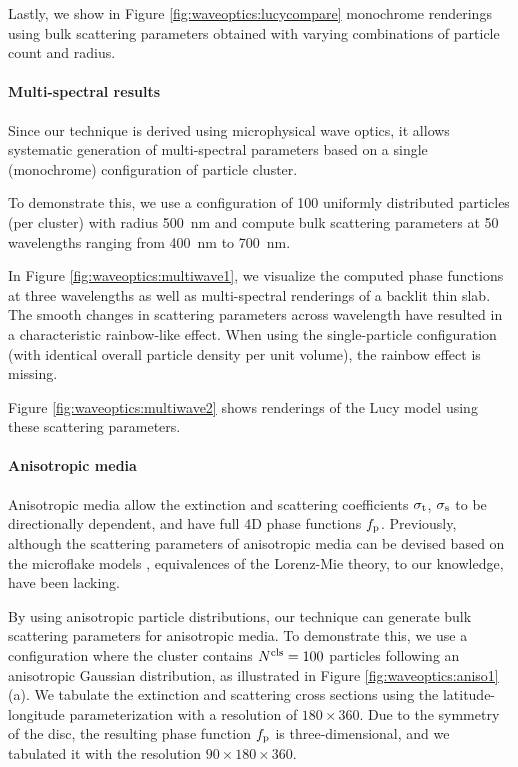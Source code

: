 Lastly, we show in Figure \ref{fig:waveoptics:lucycompare} monochrome renderings using bulk scattering parameters obtained with varying combinations of particle count and radius.


\paragraph{Multi-spectral results}

Since our technique is derived using microphysical wave optics, it allows systematic generation of multi-spectral parameters based on a single (monochrome) configuration of particle cluster.

To demonstrate this, we use a configuration of 100 uniformly distributed particles (per cluster) with radius 500~nm and compute bulk scattering parameters at 50 wavelengths ranging from 400~nm to 700~nm.





In Figure \ref{fig:waveoptics:multiwave1}, we visualize the computed phase functions at three wavelengths as well as multi-spectral renderings of a backlit thin slab.
The smooth changes in scattering parameters across wavelength have resulted in a characteristic rainbow-like effect.
When using the single-particle configuration (with identical overall particle density per unit volume), the rainbow effect is missing.

Figure \ref{fig:waveoptics:multiwave2} shows renderings of the Lucy model using these scattering parameters.


\paragraph{Anisotropic media}

Anisotropic media allow the extinction and scattering coefficients $\sigma_\mathrm{t}$, $\sigma_\mathrm{s}$ to be directionally dependent, and have full 4D phase functions $f_\mathrm{p}$.
Previously, although the scattering parameters of anisotropic media can be devised based on the microflake models \cite{jakob2010radiative,heitz2015sggx}, equivalences of the Lorenz-Mie theory, to our knowledge, have been lacking. 



By using anisotropic particle distributions, our technique can generate bulk scattering parameters for anisotropic media.
To demonstrate this, we use a configuration where the cluster contains ${N^\text{cls}} = 100$ particles following an anisotropic Gaussian distribution, as illustrated in Figure \ref{fig:waveoptics:aniso1}(a).
We tabulate the extinction and scattering cross sections using the latitude-longitude parameterization with a resolution of $180 \times 360$.
Due to the symmetry of the disc, the resulting phase function $f_\mathrm{p}$ is three-dimensional, and we tabulated it with the resolution $90 \times 180 \times360$.

